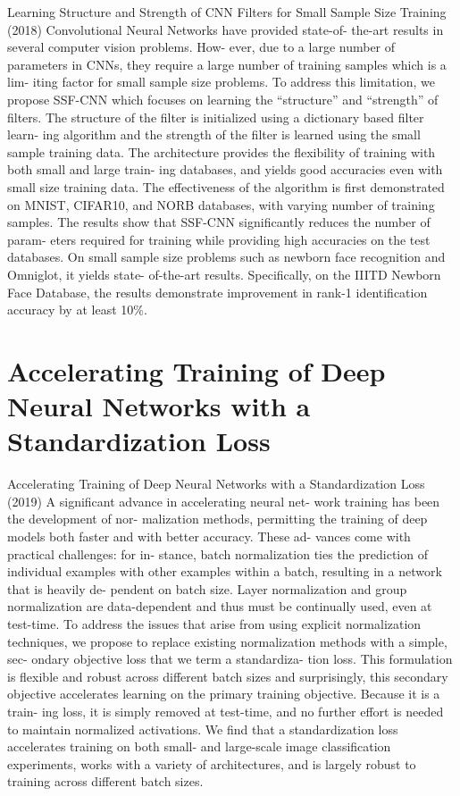 \documentclass[10pt]{beamer}
\begin{document}
\begin{frame}{Learning Structure and Strength of CNN Filters for Small Sample Size Training (2018)}
 Convolutional Neural Networks have provided state-of-
the-art results in several computer vision problems. How-
ever, due to a large number of parameters in CNNs, they
require a large number of training samples which is a lim-
iting factor for small sample size problems. To address this
limitation, we propose SSF-CNN which focuses on learning
the “structure” and “strength” of filters. The structure of
the filter is initialized using a dictionary based filter learn-
ing algorithm and the strength of the filter is learned using
the small sample training data. The architecture provides
the flexibility of training with both small and large train-
ing databases, and yields good accuracies even with small
size training data. The effectiveness of the algorithm is first
demonstrated on MNIST, CIFAR10, and NORB databases,
with varying number of training samples. The results show
that SSF-CNN significantly reduces the number of param-
eters required for training while providing high accuracies
on the test databases. On small sample size problems such
as newborn face recognition and Omniglot, it yields state-
of-the-art results. Specifically, on the IIITD Newborn Face
Database, the results demonstrate improvement in rank-1
identification accuracy by at least 10\%.
\end{frame}



\section{Accelerating Training of Deep Neural Networks with a Standardization Loss}


\begin{frame}{Accelerating Training of Deep Neural Networks with a Standardization Loss (2019)}
 A significant advance in accelerating neural net-
work training has been the development of nor-
malization methods, permitting the training of deep models
both faster and with better accuracy. These ad-
vances come with practical challenges: for in-
stance, batch normalization ties the prediction of
individual examples with other examples within
a batch, resulting in a network that is heavily de-
pendent on batch size. Layer normalization and
group normalization are data-dependent and thus
must be continually used, even at test-time. To
address the issues that arise from using explicit
normalization techniques, we propose to replace
existing normalization methods with a simple, sec-
ondary objective loss that we term a standardiza-
tion loss. This formulation is flexible and robust
across different batch sizes and surprisingly, this
secondary objective accelerates learning on the
primary training objective. Because it is a train-
ing loss, it is simply removed at test-time, and no
further effort is needed to maintain normalized
activations. We find that a standardization loss
accelerates training on both small- and large-scale
image classification experiments, works with a
variety of architectures, and is largely robust to
training across different batch sizes.
\end{frame}
\end{document}
